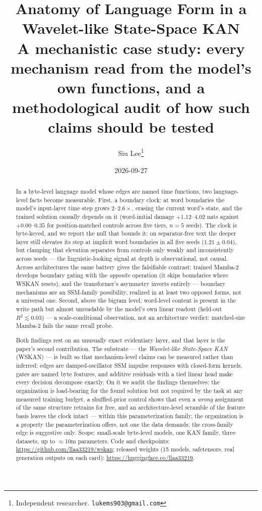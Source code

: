 \documentclass[11pt]{article}
\title{\textbf{Anatomy of Language Form in a Wavelet-like State-Space KAN}\\
\large A mechanistic case study: every mechanism read from the model's own
functions, and a methodological audit of how such claims should be tested}
\author{Siu Lee\thanks{Independent researcher. \texttt{lukems903@gmail.com}}}
\date{2026-09-27}
\newcommand{\wskan}{WSKAN}
\begin{document}
\maketitle

\begin{abstract}
\noindent
In a byte-level language model whose edges are named time functions, two
language-level facts become measurable. First, a boundary clock: at word
boundaries the model's input-layer time step grows $2$--$2.6\times$,
erasing the current word's state, and the trained solution causally
depends on it (word-initial damage $+1.12$--$4.02$ nats against
$+0.00$--$0.35$ for position-matched controls across five tiers,
$n{=}5$ seeds). The clock is byte-keyed, and we report the null that
bounds it: on separator-free text the deeper layer still elevates its
step at implicit word boundaries in all five seeds ($1.21 \pm 0.04$), but
clamping that elevation separates from controls only weakly and
inconsistently across seeds --- the
linguistic-looking signal at depth is observational, not causal. Across
architectures the same battery gives the falsifiable contrast: trained
Mamba-2 develops boundary gating with the \emph{opposite} operation (it
skips boundaries where \wskan{} resets), and the transformer's asymmetry
inverts entirely --- boundary mechanisms are an SSM-family possibility,
realized in at least two opposed forms, not a universal one. Second,
above the bigram level, word-level content is present in the write path
but almost unreadable by the model's own linear readout (held-out $R^2
\lesssim 0.03$) --- a scale-conditional observation, not an architecture
verdict: matched-size Mamba-2 fails the same recall probe.

Both findings rest on an unusually exact evidentiary layer, and that
layer is the paper's second contribution. The substrate --- the
\emph{Wavelet-like State-Space KAN} (\wskan{}) --- is built so that
mechanism-level claims can be measured rather than inferred: edges are
damped-oscillator SSM impulse responses with closed-form kernels, gates
are named byte features, and additive residuals with a tied linear head
make every decision decompose exactly. On it we audit the findings
themselves: the organization is load-bearing for the found solution but
not required by the task at any measured training budget, a
shuffled-prior control shows that even a \emph{wrong} assignment of the
same structure retrains for free, and an architecture-level scramble of
the feature basis leaves the clock intact --- within this
parameterization family, the organization is a property the
parameterization offers, not one the data demands; the cross-family edge
is suggestive only. Scope:
small-scale byte-level models, one KAN family, three datasets, up to
$\approx$10m parameters. Code and checkpoints: \url{https://github.com/llaa33219/wskan};
released weights (15 models, safetensors, real generation outputs on each
card): \url{https://huggingface.co/llaa33219}.
\end{abstract}
\end{document}
